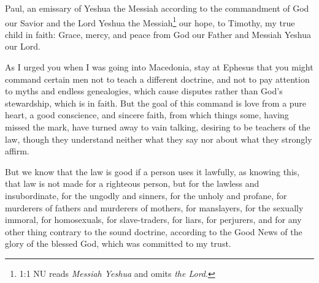 






\vspace{-1.36in}


\mychapter{} \myverse*{}Paul, an emissary of Yeshua the Messiah according to the commandment
of God our Savior and the Lord Yeshua the Messiah\footnote{1:1 NU reads \textit{Messiah Yeshua} and omits \textit{the Lord}.} our hope,
\myverse{}to Timothy, my true child in faith: Grace, mercy, and peace from God our Father
and Messiah Yeshua our Lord.

\myverse{}As I urged you when I was going into Macedonia, stay at Ephesus
that you might command certain men not to teach a different doctrine,
\myverse{}and not to pay attention to myths and endless genealogies, which cause disputes
rather than God’s stewardship, which is in faith.
\myverse{}But the goal of this command is love from a pure heart, a good conscience, and
sincere faith,
\myverse{}from which things some, having missed the mark, have turned away to vain talking,
\myverse{}desiring to be teachers of the law, though they understand neither what they
say nor about what they strongly affirm.

\myverse{}But we know that the law is good if a person uses it lawfully,
\myverse{}as knowing this, that law is not made for a righteous person, but for the lawless
and insubordinate, for the ungodly and sinners, for the unholy and profane, for murderers of fathers and
murderers of mothers, for manslayers,
\myverse{}for the sexually immoral, for homosexuals, for slave-traders, for liars, for
perjurers, and for any other thing contrary to the sound doctrine,
\myverse{}according to the Good News of the glory of the blessed God, which was committed
to my trust.

